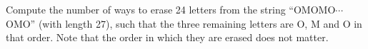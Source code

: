 Compute the number of ways to erase 24 letters from the string ``OMOMO$\cdots$OMO'' (with length 27), such that the three remaining letters are O, M and O in that order. Note that the order in which they are erased does not matter.
